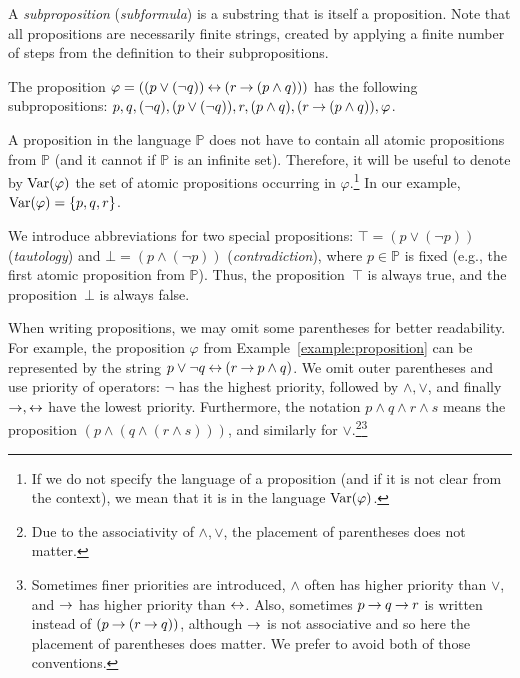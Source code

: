 A \emph{subproposition} (\emph{subformula}) is a substring that is itself a proposition. Note that all propositions are necessarily finite strings, created by applying a finite number of steps from the definition to their subpropositions.

\begin{example}\label{example:proposition}
The proposition $\varphi = ((p \lor (\neg q)) \mathbin{\leftrightarrow} (r \mathbin{\rightarrow} (p \land q)))$ has the following subpropositions: $p, q, (\neg q), (p \lor (\neg q)), r, (p \land q), (r \mathbin{\rightarrow} (p \land q)), \varphi$.
\end{example}

A proposition in the language $\mathbb{P}$ does not have to contain all atomic propositions from $\mathbb{P}$ (and it cannot if $\mathbb{P}$ is an infinite set). Therefore, it will be useful to denote by $\operatorname{Var}(\varphi)$ the set of atomic propositions occurring in $\varphi$.\footnote{If we do not specify the language of a proposition (and if it is not clear from the context), we mean that it is in the language $\operatorname{Var}(\varphi)$.} In our example, $\operatorname{Var}(\varphi)=\{p, q, r\}$.

We introduce abbreviations for two special propositions: $\top = (p \lor (\neg p))$ (\emph{tautology}) and $\bot = (p \land (\neg p))$ (\emph{contradiction}), where $p \in \mathbb{P}$ is fixed (e.g., the first atomic proposition from $\mathbb{P}$). Thus, the proposition~$\top$ is always true, and the proposition~$\bot$ is always false.

When writing propositions, we may omit some parentheses for better readability. For example, the proposition $\varphi$ from Example~\ref{example:proposition} can be represented by the string
$p \lor \neg q \mathbin{\leftrightarrow} (r \mathbin{\rightarrow} p \land q)$. We omit outer parentheses and use priority of operators: $\neg$ has the highest priority, followed by $\land, \lor$, and finally $\mathbin{\rightarrow}, \mathbin{\leftrightarrow}$ have the lowest priority. Furthermore, the notation $p \land q \land r \land s$ means the proposition $(p \land (q \land (r \land s)))$, and similarly for $\lor$.\footnote{Due to the associativity of $\land, \lor$, the placement of parentheses does not matter.}\footnote{Sometimes finer priorities are introduced, $\land$ often has higher priority than $\lor$, and $\mathbin{\rightarrow}$ has higher priority than $\mathbin{\leftrightarrow}$. Also, sometimes $p \mathbin{\rightarrow} q \mathbin{\rightarrow} r$ is written instead of $(p \mathbin{\rightarrow} (r \mathbin{\rightarrow} q))$, although $\mathbin{\rightarrow}$ is not associative and so here the placement of parentheses does matter. We prefer to avoid both of those conventions.}

